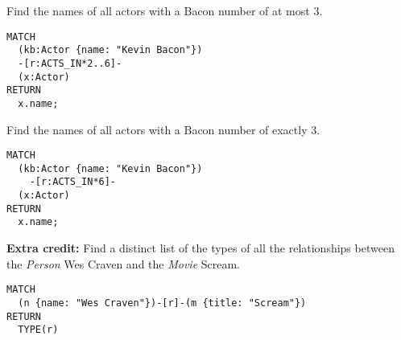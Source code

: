\documentclass[a4paper,12pt]{exam}
\begin{document}
\begin{questions}
\question
Find the names of all actors with a Bacon number of at most 3.
\begin{solution}
  \begin{verbatim}
MATCH
  (kb:Actor {name: "Kevin Bacon"})
  -[r:ACTS_IN*2..6]-
  (x:Actor)
RETURN
  x.name;
  \end{verbatim}
\end{solution}

\question
Find the names of all actors with a Bacon number of exactly 3.
\begin{solution}
  \begin{verbatim}
MATCH
  (kb:Actor {name: "Kevin Bacon"})
    -[r:ACTS_IN*6]-
  (x:Actor)
RETURN
  x.name;
  \end{verbatim}
\end{solution}

\question
\textbf{Extra credit:} Find a distinct list of the types of all the relationships between the \emph{Person} Wes Craven and the \emph{Movie} Scream.
\begin{solution}
  \begin{verbatim}
MATCH
  (n {name: "Wes Craven"})-[r]-(m {title: "Scream"})
RETURN
  TYPE(r)
  \end{verbatim}
\end{solution}



\end{questions}





\end{document}
